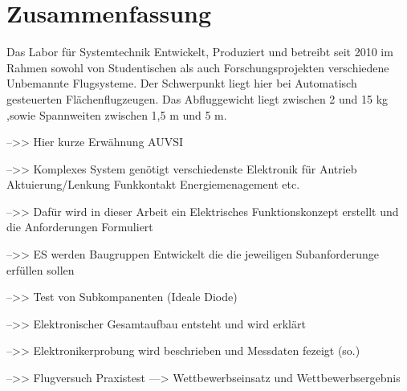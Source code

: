 \chapter*{Zusammenfassung}

Das Labor für Systemtechnik Entwickelt, Produziert und betreibt seit 2010 im Rahmen sowohl von Studentischen als auch Forschungsprojekten verschiedene Unbemannte Flugsysteme.
Der Schwerpunkt liegt hier bei Automatisch gesteuerten Flächenflugzeugen.
Das Abfluggewicht liegt zwischen 2 und 15 kg ,sowie Spannweiten zwischen 1,5 m und 5 m.

-->> Hier kurze Erwähnung AUVSI 

-->> Komplexes System genötigt verschiedenste Elektronik für Antrieb Aktuierung/Lenkung Funkkontakt Energiemenagement etc.

-->> Dafür wird in dieser Arbeit ein Elektrisches Funktionskonzept erstellt und die Anforderungen Formuliert

-->> ES werden Baugruppen Entwickelt die die jeweiligen Subanforderunge erfüllen sollen

-->> Test von Subkompanenten (Ideale Diode)

-->> Elektronischer Gesamtaufbau entsteht und wird erklärt

-->> Elektronikerprobung wird beschrieben und Messdaten fezeigt (so.)

-->> Flugversuch Praxistest ---> Wettbewerbseinsatz und Wettbewerbsergebnis

